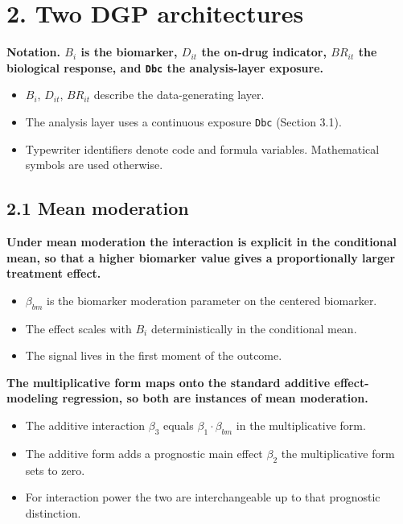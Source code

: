\documentclass[
  11pt,
]{article}
\begin{document}
\section{2. Two DGP architectures}

\textbf{Notation. $B_i$ is the biomarker, $D_{it}$ the on-drug
indicator, $BR_{it}$ the biological response, and \texttt{Dbc} the
analysis-layer exposure.}

\begin{itemize}\setlength{\itemsep}{2pt}\setlength{\parskip}{0pt}
\item $B_i$, $D_{it}$, $BR_{it}$ describe the data-generating layer.
\item The analysis layer uses a continuous exposure \texttt{Dbc}
(Section 3.1).
\item Typewriter identifiers denote code and formula variables.
Mathematical symbols are used otherwise.
\end{itemize}

\subsection{2.1 Mean moderation}

\textbf{Under mean moderation the interaction is explicit in the
conditional mean, so that a higher biomarker value gives a
proportionally larger treatment effect.}

\begin{itemize}\setlength{\itemsep}{2pt}\setlength{\parskip}{0pt}
\item $\beta_{bm}$ is the biomarker moderation parameter on the
centered biomarker.
\item The effect scales with $B_i$ deterministically in the
conditional mean.
\item The signal lives in the first moment of the outcome.
\end{itemize}

\textbf{The multiplicative form maps onto the standard additive
effect-modeling regression, so both are instances of mean
moderation.}

\begin{itemize}\setlength{\itemsep}{2pt}\setlength{\parskip}{0pt}
\item The additive interaction $\beta_3$ equals
$\beta_1 \cdot \beta_{bm}$ in the multiplicative form.
\item The additive form adds a prognostic main effect $\beta_2$ the
multiplicative form sets to zero.
\item For interaction power the two are interchangeable up to that
prognostic distinction.
\end{itemize}
\end{document}
